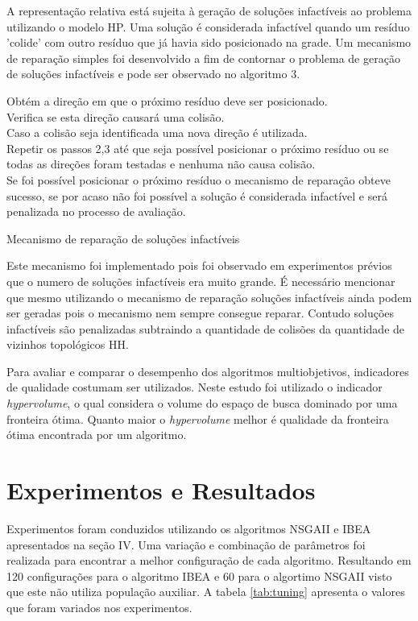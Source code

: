 \documentclass[conference]{IEEEtran}
\begin{document}
A representação relativa está sujeita à geração de soluções infactíveis ao problema utilizando o modelo HP. Uma solução é considerada infactível quando um resíduo 'colide' com outro resíduo que já havia sido posicionado na grade. Um mecanismo de reparação simples foi desenvolvido a fim de contornar o problema de geração de soluções infactíveis e pode ser observado no algoritmo 3.

\begin{algorithm}[h]
	\label{algo:reparacao}
	Obtém a direção em que o próximo resíduo deve ser posicionado.\\
	Verifica se esta direção causará uma colisão.\\
	Caso a colisão seja identificada uma nova direção é utilizada.\\
	Repetir os passos 2,3 até que seja possível posicionar o próximo resíduo ou se todas as direções foram testadas e nenhuma não causa colisão.\\
	Se foi possível posicionar o próximo resíduo o mecanismo de reparação obteve sucesso, se por acaso não foi possível a solução é considerada infactível e será penalizada no processo de avaliação.
	\caption{Mecanismo de reparação de soluções infactíveis}
\end{algorithm}

Este mecanismo foi implementado pois foi observado em experimentos prévios que o numero de soluções infactíveis era muito grande. É necessário mencionar que mesmo utilizando o mecanismo de reparação soluções infactíveis ainda podem ser geradas pois o mecanismo nem sempre consegue reparar. Contudo soluções infactíveis são penalizadas subtraindo a quantidade de colisões da quantidade de vizinhos topológicos HH.

Para  avaliar e comparar o desempenho dos algoritmos multiobjetivos, indicadores de qualidade costumam ser utilizados. Neste estudo foi utilizado o indicador \textit{hypervolume}, o qual considera o volume do espaço de busca dominado por uma fronteira ótima\cite{zitzler2003performance}. Quanto maior o \textit{hypervolume} melhor é qualidade da fronteira ótima encontrada por um algoritmo.

\section{Experimentos e Resultados}
Experimentos foram conduzidos utilizando os algoritmos NSGAII e IBEA apresentados na seção IV. Uma variação e combinação de parâmetros foi realizada para encontrar a melhor configuração de cada algoritmo. Resultando em 120 configurações para o algoritmo IBEA e 60 para o algortimo NSGAII visto que este não utiliza população auxiliar. A tabela \ref{tab:tuning} apresenta o  valores que foram variados nos experimentos.
\end{document}
